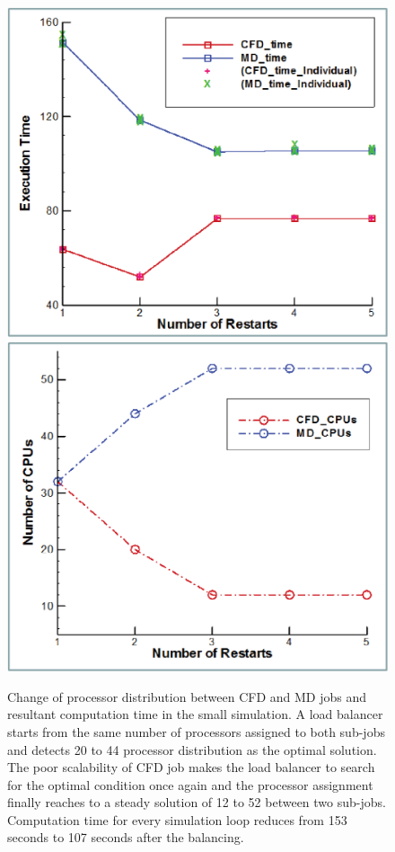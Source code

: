 \documentclass[conference,final]{IEEEtran}
\begin{document}
\begin{figure}
\centering
\includegraphics[scale=0.40]{BJ_Execution_Small_Time.eps}
\linebreak
\includegraphics[scale=0.40]{BJ_Execution_Small_CPUs.eps}
\caption{\small Change of processor distribution between CFD and MD jobs and resultant computation time in the small simulation. A load balancer starts from the same number of processors assigned to both sub-jobs and detects 20 to 44 processor distribution as the optimal solution. The poor scalability of CFD job makes the load balancer to search for the optimal condition once again and the processor assignment finally reaches to a steady solution of 12 to 52 between two sub-jobs. Computation time for every simulation loop reduces from 153 seconds to 107 seconds after the balancing.}
\label{Fig:LBSmall}
\end{figure}
\end{document}
